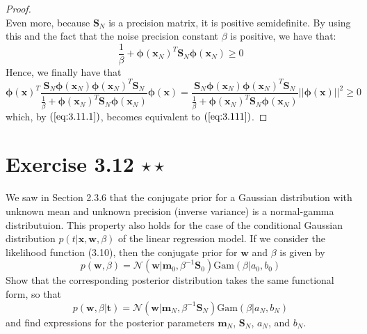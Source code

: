 \begin{proof}
\[    \] 
    Even more, because $\mathbf{S}_N$ is a precision matrix, it is 
    positive semidefinite. By using this and the fact that the noise
    precision constant $\beta$ is positive, we have that:
    \[
        \frac{1}{\beta} + \bm{\phi}(\mathbf{x}_N)^T\mathbf{S}_N\bm{\phi}(\mathbf{x}_N) \geq 0
    \] 
    Hence, we finally have that 
    \[
        \bm{\phi}(\mathbf{x})^T
        \frac{\mathbf{S}_N\bm{\phi}(\mathbf{x}_N)\bm{\phi}(\mathbf{x}_N)^T\mathbf{S}_N}
        {\frac{1}{\beta} + \bm{\phi}(\mathbf{x}_N)^T\mathbf{S}_N\bm{\phi}(\mathbf{x}_N)}
        \bm{\phi}(\mathbf{x}) 
        = \frac{\mathbf{S}_N\bm{\phi}(\mathbf{x}_N)\bm{\phi}(\mathbf{x}_N)^T\mathbf{S}_N}
          {\frac{1}{\beta} + \bm{\phi}(\mathbf{x}_N)^T\mathbf{S}_N\bm{\phi}(\mathbf{x}_N)}
          ||\bm{\phi}(\mathbf{x})||^2 \geq 0
    \] 
    which, by $(\ref{eq:3.11.1})$, becomes equivalent to $(\ref{eq:3.111})$.
\end{proof}

\section*{Exercise 3.12 $\star \star$}
We saw in Section 2.3.6 that the conjugate prior for a Gaussian distribution
with unknown mean and unknown precision (inverse variance) is a normal-gamma
distributuion. This property also holds for the case of the conditional
Gaussian distribution $p(t | \mathbf{x}, \mathbf{w}, \beta)$ of the linear
regression model. If we consider the likelihood function (3.10), then
the conjugate prior for $\mathbf{w}$ and $\beta$ is given by
\begin{equation}\label{eq:3.112}\tag{3.112}
    p(\mathbf{w}, \beta) 
    = \mathcal{N}(\mathbf{w} | \mathbf{m}_0, \beta^{-1}\mathbf{S}_0) \text{Gam}(\beta | a_0, b_0)
\end{equation}
Show that the corresponding posterior distribution takes the same functional
form, so that 
\begin{equation}\label{eq:3.113}\tag{3.113}
    p(\mathbf{w}, \beta | \mathbf{t}) 
    = \mathcal{N}(\mathbf{w} | \mathbf{m}_N, \beta^{-1} \mathbf{S}_N) \text{Gam}(\beta | a_N, b_N)
\end{equation}
and find expressions for the posterior parameters $\mathbf{m}_N$, $\mathbf{S}_N$, $a_N$, 
and $b_N$.

\vspace{1em}

